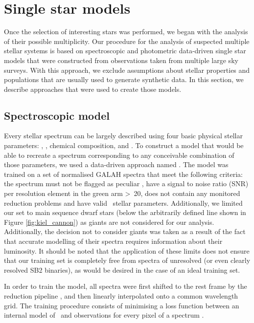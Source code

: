 \section{Single star models}
\label{sec:models_all}
Once the selection of interesting stars was performed, we began with the analysis of their possible multiplicity. Our procedure for the analysis of suspected multiple stellar systems is based on spectroscopic and photometric data-driven single star models that were constructed from observations taken from multiple large sky surveys. With this approach, we exclude assumptions about stellar properties and populations that are usually used to generate synthetic data. In this section, we describe approaches that were used to create those models.

\subsection{Spectroscopic model}
\label{sec:s_model}
Every stellar spectrum can be largely described using four basic physical stellar parameters: \Teff, \Logg, chemical composition, and \vsin. To construct a model that would be able to recreate a spectrum corresponding to any conceivable combination of those parameters, we used a data-driven approach named \TC. The model was trained on a set of normalised GALAH spectra that meet the following criteria: the spectrum must not be flagged as peculiar \citep{2017ApJS..228...24T}, have a signal to noise ratio (SNR) per resolution element in the green arm >~20, does not contain any monitored reduction problems and have valid \TC\ stellar parameters. Additionally, we limited our set to main sequence dwarf stars (below the arbitrarily defined line shown in Figure \ref{fig:kiel_cannon}) as giants are not considered for our analysis. Additionally, the decision not to consider giants was taken as a result of the fact that accurate modelling of their spectra requires information about their luminosity. It should be noted that the application of these limits does not ensure that our training set is completely free from spectra of unresolved (or even clearly resolved SB2 binaries), as would be desired in the case of an ideal training set.

In order to train the model, all spectra were first shifted to the rest frame by the reduction pipeline \citep{2017MNRAS.464.1259K}, and then linearly interpolated onto a common wavelength grid. The training procedure consists of minimising a loss function between an internal model of \TC\ and observations for every pixel of a spectrum \citep{2015ApJ...808...16N}.

